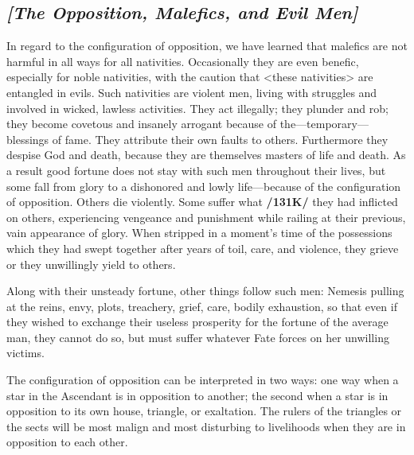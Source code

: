 \subsection{\textit{[The Opposition, Malefics, and Evil Men]}}
In  regard to the configuration of opposition, we have learned that malefics are not harmful in all ways for all nativities. Occasionally they are even benefic, especially for noble nativities, with the caution that <these nativities> are entangled in evils. Such nativities are violent men, living with struggles and involved in wicked, lawless activities. They act illegally; they plunder and rob; they become covetous and insanely arrogant because of the—temporary—blessings of fame. They attribute their own faults to others. Furthermore they despise God and death, because they are themselves masters of life and death. As a result good fortune does not stay with such men throughout their lives, but some fall from glory to a dishonored and lowly life—because of the configuration of opposition. Others die violently. Some suffer what \textbf{/131K/} they had inflicted on others, experiencing vengeance and punishment while railing at their previous, vain appearance of glory. When stripped in a moment’s time of the possessions which they had swept together
after years of toil, care, and violence, they grieve or they unwillingly yield to others. 

Along with their unsteady fortune, other things follow such men: Nemesis pulling at the reins, envy, plots, treachery, grief, care, bodily exhaustion, so that even if they wished to exchange their useless prosperity for the fortune of the average man, they cannot do so, but must suffer whatever Fate forces on her unwilling victims. 

The configuration of opposition can be interpreted in two ways: one way when a star in the Ascendant is in opposition to another; the second when a star is in opposition to its own house, triangle, or exaltation. The rulers of the triangles or the sects will be most malign and most disturbing to livelihoods when they are in opposition to each other.

\newpage